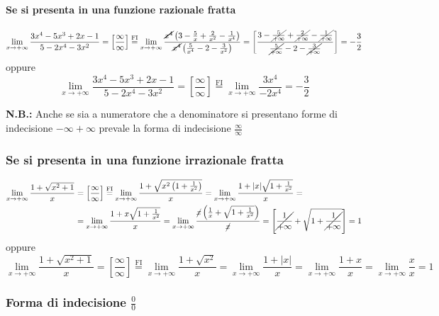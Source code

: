 \documentclass{book}     %
\begin{document}
\paragraph{Se si presenta in una funzione razionale fratta}
\begin{ex}
\[\lim_{x\to +\infty}\frac{3x^4-5x^3+2x-1}{5-2x^4-3x^2}=\left[\frac{\infty}{\infty}\right]\overset{\mathrm{FI}}{=}\lim_{x\to +\infty}\frac{\cancel{x^4}\left( 3-\frac{5}{x}+\frac{2}{x^2}-\frac{1}{x^4} \right)}{\cancel{x^4}\left(\frac{5}{x^4} -2 -\frac{3}{x^2}\right)}=\left[ \frac{ 3-\cancel{\frac{5}{+\infty}}+\cancel{\frac{2}{+\infty}}-\cancel{\frac{1}{+\infty}}}{\cancel{\frac{5}{+\infty}} -2 -\cancel{\frac{3}{+\infty}}} \right]=-\frac{3}{2}\]
oppure
\[\lim_{x\to +\infty}\frac{3x^4-5x^3+2x-1}{5-2x^4-3x^2}=\left[\frac{\infty}{\infty}\right]\overset{\mathrm{FI}}{=}\lim_{x\to +\infty}\frac{3x^4}{-2x^4}=-\frac{3}{2}\]
\end{ex}
\textbf{N.B.:} Anche se sia a numeratore che a denominatore si presentano forme di indecisione $-\infty+\infty$ prevale la forma di indecisione $\frac{\infty}{\infty}$
\subsubsection{Se si presenta in una funzione irrazionale fratta}
\begin{ex}
\[\begin{aligned}\lim_{x\to +\infty}\frac{1+\sqrt{x^2+1}}{x}&=\left[\frac{\infty}{\infty}\right]\overset{\mathrm{FI}}{=}\lim_{x\to +\infty}\frac{1+\sqrt{x^2\left( 1+\frac{1}{x^2} \right)}}{x}=\lim_{x\to +\infty}\frac{1+|x|\sqrt{1+\frac{1}{x^2}}}{x}=\\&=\lim_{x\to +\infty}\frac{1+x\sqrt{1+\frac{1}{x^2}}}{x}=\lim_{x\to +\infty}\frac{\cancel{x}\left( \frac{1}{x} +\sqrt{1+\frac{1}{x^2}}\right)}{\cancel{x}}=\left[ \cancel{\frac{1}{+\infty}} +\sqrt{1+\cancel{\frac{1}{+\infty}}} \right] =1\end{aligned}\]
oppure
\[\lim_{x\to +\infty}\frac{1+\sqrt{x^2+1}}{x}=\left[\frac{\infty}{\infty}\right]\overset{\mathrm{FI}}{=}\lim_{x\to +\infty}\frac{1+\sqrt{x^2}}{x}=\lim_{x\to +\infty}\frac{1+|x|}{x}=\lim_{x\to +\infty}\frac{1+x}{x}=\lim_{x\to +\infty}\frac{x}{x}= 1\]
\end{ex}
\subsubsection{Forma di indecisione $\frac{0}{0}$}
\end{document}
